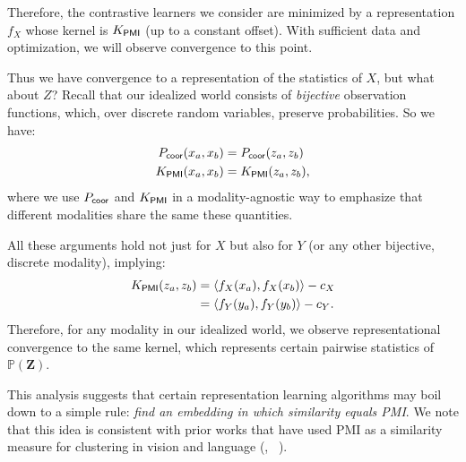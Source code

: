 \documentclass{article}
\theoremstyle{plain}
\theoremstyle{definition}
\theoremstyle{remark}
\begin{document}
Therefore, the contrastive learners we consider are minimized by a representation $f_X$ whose kernel is $K_\mathsf{PMI}$ (up to a constant offset). With sufficient data and optimization, we will observe convergence to this point.

Thus we have convergence to a representation of the statistics of $X$, but what about $Z$? Recall that our idealized world consists of \textit{bijective} observation functions, which, over discrete random variables, preserve probabilities. So we have:
\begin{align*}
    {P}_\mathsf{coor}(x_a, x_b) &= {P}_\mathsf{coor}(z_a, z_b)\\
    K_\mathsf{PMI}(x_a, x_b) &= K_\mathsf{PMI}(z_a, z_b),
\end{align*}
where we use ${P}_\mathsf{coor}$ and $K_\mathsf{PMI}$ in a modality-agnostic way to emphasize that different modalities share the same these quantities.



All these arguments hold not just for $X$ but also for $Y$ (or any other bijective, discrete modality), implying:
\begin{align}
    K_\mathsf{PMI}(z_a, z_b) 
    & = \langle f_X(x_a), f_X(x_b) \rangle - c_X \\
    & =     \langle f_Y(y_a), f_Y(y_b) \rangle  - c_Y.
\end{align}
Therefore, for any modality in our idealized world, we observe representational convergence to the same kernel, which represents certain pairwise statistics of $\mathbb{P}(\mathbf{Z})$.

This analysis suggests that certain representation learning algorithms may boil down to a simple rule: \textit{find an embedding in which similarity equals PMI}. We note that this idea is consistent with prior works that have used PMI as a similarity measure for clustering in vision and language (\eg, ~\citet{crisp_boundaries, isola_thesis, isola_cooc, chambers2008unsupervised}).
\end{document}
